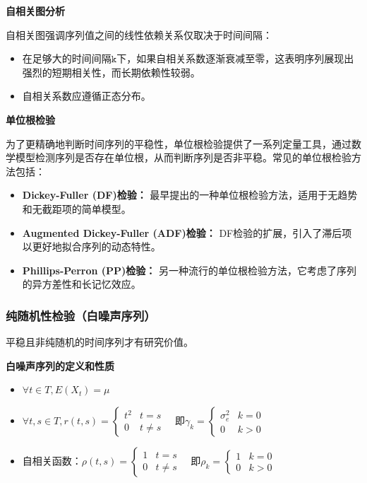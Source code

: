 \documentclass{article} %
\begin{document}
      \textbf{自相关图分析}

      自相关图强调序列值之间的线性依赖关系仅取决于时间间隔：
      \begin{itemize}
          \item 在足够大的时间间隔\(\texttt{k}\)下，如果自相关系数逐渐衰减至零，这表明序列展现出强烈的短期相关性，而长期依赖性较弱。
          \item 自相关系数应遵循正态分布。
      \end{itemize}
      
      \textbf{单位根检验}

      为了更精确地判断时间序列的平稳性，单位根检验提供了一系列定量工具，通过数学模型检测序列是否存在单位根，从而判断序列是否非平稳。常见的单位根检验方法包括：
      \begin{itemize}
          \item \textbf{Dickey-Fuller (DF)检验：} 最早提出的一种单位根检验方法，适用于无趋势和无截距项的简单模型。
          \item \textbf{Augmented Dickey-Fuller (ADF)检验：} DF检验的扩展，引入了滞后项以更好地拟合序列的动态特性。
          \item \textbf{Phillips-Perron (PP)检验：} 另一种流行的单位根检验方法，它考虑了序列的异方差性和长记忆效应。
      \end{itemize}
      

\subsubsection{纯随机性检验（白噪声序列）}
平稳且非纯随机的时间序列才有研究价值。

\textbf{白噪声序列的定义和性质}
\begin{itemize}
\item \(\forall t\in T,E(X_t)=\mu\quad\)
\item \(\forall t,s\in T,r(t,s)=\begin{cases}t^2&t=s\\0&t\neq s\end{cases}\quad\text{即}\gamma_k=\begin{cases}\sigma_e^2 & k=0\\ 0 & k>0 \end{cases} \)
\item 自相关函数：\(\rho(t,s)=\begin{cases}1&t=s\\0&t\neq s\end{cases}\quad\text{即} \rho_k=\begin{cases}1 & k=0\\ 0 & k>0 \end{cases}\)
\end{itemize}
\end{document}

